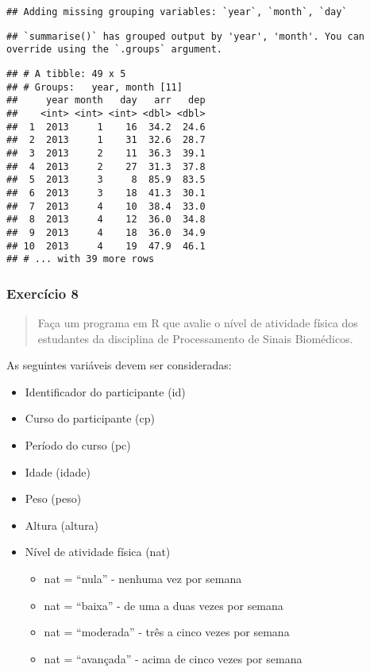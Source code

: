 \documentclass[
]{article}
\providecommand{\tightlist}{%
  \setlength{\itemsep}{0pt}\setlength{\parskip}{0pt}}
\begin{document}
\begin{verbatim}
## Adding missing grouping variables: `year`, `month`, `day`
\end{verbatim}

\begin{verbatim}
## `summarise()` has grouped output by 'year', 'month'. You can override using the `.groups` argument.
\end{verbatim}

\begin{verbatim}
## # A tibble: 49 x 5
## # Groups:   year, month [11]
##     year month   day   arr   dep
##    <int> <int> <int> <dbl> <dbl>
##  1  2013     1    16  34.2  24.6
##  2  2013     1    31  32.6  28.7
##  3  2013     2    11  36.3  39.1
##  4  2013     2    27  31.3  37.8
##  5  2013     3     8  85.9  83.5
##  6  2013     3    18  41.3  30.1
##  7  2013     4    10  38.4  33.0
##  8  2013     4    12  36.0  34.8
##  9  2013     4    18  36.0  34.9
## 10  2013     4    19  47.9  46.1
## # ... with 39 more rows
\end{verbatim}

\hypertarget{exercuxedcio-8}{%
\subsubsection{Exercício 8}\label{exercuxedcio-8}}

\begin{quote}
Faça um programa em R que avalie o nível de atividade física dos
estudantes da disciplina de Processamento de Sinais Biomédicos.
\end{quote}

As seguintes variáveis devem ser consideradas:

\begin{itemize}
\tightlist
\item
  Identificador do participante (id)
\item
  Curso do participante (cp)
\item
  Período do curso (pc)
\item
  Idade (idade)
\item
  Peso (peso)
\item
  Altura (altura)
\item
  Nível de atividade física (nat)

  \begin{itemize}
  \tightlist
  \item
    nat = ``nula'' - nenhuma vez por semana
  \item
    nat = ``baixa'' - de uma a duas vezes por semana
  \item
    nat = ``moderada'' - três a cinco vezes por semana
  \item
    nat = ``avançada'' - acima de cinco vezes por semana
  \end{itemize}
\end{itemize}
\end{document}
